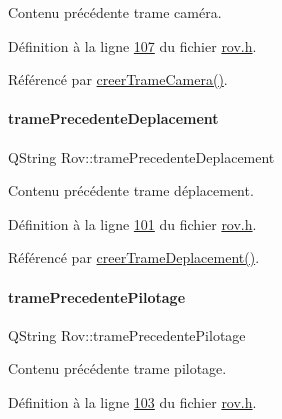 Contenu précédente trame caméra. 



Définition à la ligne \hyperlink{rov_8h_source_l00107}{107} du fichier \hyperlink{rov_8h_source}{rov.\+h}.



Référencé par \hyperlink{rov_8cpp_source_l00251}{creer\+Trame\+Camera()}.

\mbox{\label{class_rov_a6e42b166c837f5103b53bb9eae35f087}} 
\paragraph{\texorpdfstring{trame\+Precedente\+Deplacement}{tramePrecedenteDeplacement}}
{\footnotesize\ttfamily Q\+String Rov\+::trame\+Precedente\+Deplacement\hspace{0.3cm}{\ttfamily [private]}}



Contenu précédente trame déplacement. 



Définition à la ligne \hyperlink{rov_8h_source_l00101}{101} du fichier \hyperlink{rov_8h_source}{rov.\+h}.



Référencé par \hyperlink{rov_8cpp_source_l00208}{creer\+Trame\+Deplacement()}.

\mbox{\label{class_rov_a12b08128a49ca43fc1198fdeb6a6f0cd}} 
\paragraph{\texorpdfstring{trame\+Precedente\+Pilotage}{tramePrecedentePilotage}}
{\footnotesize\ttfamily Q\+String Rov\+::trame\+Precedente\+Pilotage\hspace{0.3cm}{\ttfamily [private]}}



Contenu précédente trame pilotage. 



Définition à la ligne \hyperlink{rov_8h_source_l00103}{103} du fichier \hyperlink{rov_8h_source}{rov.\+h}.



